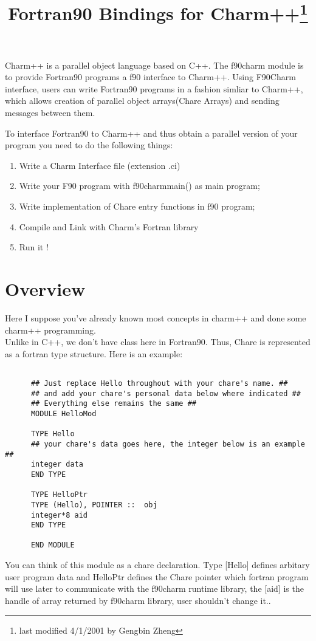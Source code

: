 \documentclass[11pt]{article}
\title{Fortran90 Bindings for Charm++\footnote{last modified 4/1/2001 by Gengbin Zheng}}
\begin{document}
\maketitle

Charm++ is a parallel object language based on C++. The f90charm module is to
provide Fortran90 programs a f90 interface to Charm++. Using F90Charm interface,
users can write Fortran90 programs in a fashion simliar to Charm++, which allows
creation of parallel object arrays(Chare Arrays) and sending messages between 
them.

To interface Fortran90 to Charm++ and thus obtain a parallel version of your 
program you need to do the following things:
\begin{enumerate}
\item Write a Charm Interface file (extension .ci)
\item Write your F90 program with f90charmmain() as main program;
\item Write implementation of Chare entry functions in f90 program;
\item Compile and Link with Charm's Fortran library
\item Run it !
\end{enumerate}

\section{Overview}

Here I suppose you've already known most concepts in charm++ and done some 
charm++ programming.  \\
Unlike in C++, we don't have class here in Fortran90. Thus, Chare is 
represented as a fortran type structure. Here is an example:

\begin{verbatim}

      ## Just replace Hello throughout with your chare's name. ##
      ## and add your chare's personal data below where indicated ##
      ## Everything else remains the same ##
      MODULE HelloMod

      TYPE Hello
      ## your chare's data goes here, the integer below is an example ##
      integer data
      END TYPE

      TYPE HelloPtr
      TYPE (Hello), POINTER ::  obj
      integer*8 aid
      END TYPE

      END MODULE
\end{verbatim}
You can think of this module as a chare declaration. Type [Hello] defines 
arbitary user program data and HelloPtr defines the Chare pointer which 
fortran program will use later to communicate with the f90charm runtime 
library, the [aid] is the handle of array returned by f90charm library, user 
shouldn't change it..
\end{document}
